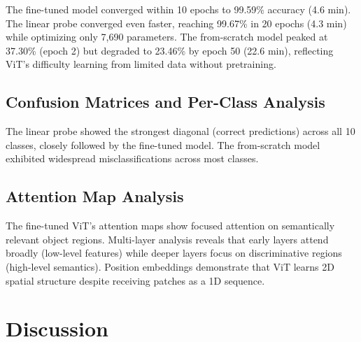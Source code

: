 \documentclass[12pt]{article}
\begin{document}
The fine-tuned model converged within 10 epochs to 99.59\% accuracy (4.6 min). The linear probe converged even faster, reaching 99.67\% in 20 epochs (4.3 min) while optimizing only 7,690 parameters. The from-scratch model peaked at 37.30\% (epoch 2) but degraded to 23.46\% by epoch 50 (22.6 min), reflecting ViT's difficulty learning from limited data without pretraining.

\subsection{Confusion Matrices and Per-Class Analysis}


The linear probe showed the strongest diagonal (correct predictions) across all 10 classes, closely followed by the fine-tuned model. The from-scratch model exhibited widespread misclassifications across most classes.

\subsection{Attention Map Analysis}


The fine-tuned ViT's attention maps show focused attention on semantically relevant object regions. Multi-layer analysis reveals that early layers attend broadly (low-level features) while deeper layers focus on discriminative regions (high-level semantics). Position embeddings demonstrate that ViT learns 2D spatial structure despite receiving patches as a 1D sequence.

\section{Discussion}
\end{document}
